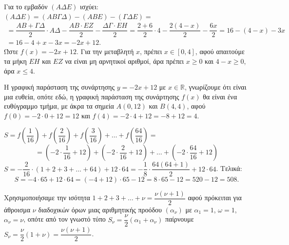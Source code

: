 
\begin{alist}
\item Για το εμβαδόν $(A\Delta E)$ ισχύει: $(A\Delta E) = (AB\Gamma\Delta) - (ABE) - (\Gamma\Delta E) =$
\begin{gather*}
= \dfrac{AB + \Gamma\Delta}{2} \cdot A\Delta - \dfrac{AB \cdot EZ}{2} - \dfrac{\Delta\Gamma \cdot EH}{2} = \dfrac{2 + 6}{2} \cdot 4 - \dfrac{2(4 - x)}{2} - \dfrac{6x}{2} = 16 - (4 - x) - 3x \\
= 16 - 4 + x - 3x = -2x + 12.
\end{gather*}
Ώστε $f(x) = -2x + 12$.
Για την μεταβλητή $x$, πρέπει $x \in [0,4]$, αφού απαιτούμε τα μήκη $EH$ και $EZ$ να είναι μη
αρνητικοί αριθμοί, άρα πρέπει $x \ge 0$ και $4 - x \ge 0$, άρα $x \le 4$.

\item Η γραφική παράσταση της συνάρτησης $y = -2x + 12$ με $x \in \mathbb{R}$, γνωρίζουμε ότι είναι μια ευθεία, οπότε εδώ, η γραφική παράσταση της συνάρτησης $f(x)$ θα είναι ένα ευθύγραμμο τμήμα, με άκρα τα σημεία $A(0,12)$ και $B(4,4)$, αφού $f(0) = -2 \cdot 0 + 12 = 12$ και $f(4) = -2 \cdot 4 + 12 = -8 + 12 = 4$.

\item $S = f\left(\dfrac{1}{16}\right) + f\left(\dfrac{2}{16}\right) + f\left(\dfrac{3}{16}\right) + \dots + f\left(\dfrac{64}{16}\right) =$
\[= \left(-2 \cdot \dfrac{1}{16} + 12\right) + \left(-2 \cdot \dfrac{2}{16} + 12\right) + \dots + \left(-2 \cdot \dfrac{64}{16} + 12\right)\]
$S = -\dfrac{2}{16} \cdot (1 + 2 + 3 + \dots + 64) + 12 \cdot 64 = -\dfrac{1}{8} \cdot \dfrac{64(64+1)}{2} + 12 \cdot 64$. Τελικά:
\[S = -4 \cdot 65 + 12 \cdot 64 = (-4 + 12) \cdot 65 - 12 = 8 \cdot 65 - 12 = 520 - 12 = 508.\]

Χρησιμοποιήσαμε την ισότητα $1 + 2 + 3 + \dots + \nu = \dfrac{\nu(\nu+1)}{2}$ αφού πρόκειται για άθροισμα $\nu$ διαδοχικών όρων μιας αριθμητικής προόδου $(\alpha_\nu)$ με $\alpha_1 = 1$, $\omega = 1$, $\alpha_\nu = \nu$, οπότε από τον
γνωστό τύπο $S_\nu = \dfrac{\nu}{2}(\alpha_1 + \alpha_\nu)$ παίρνουμε $S_\nu = \dfrac{\nu}{2}(1 + \nu) = \dfrac{\nu(\nu+1)}{2}$.
\end{alist}

